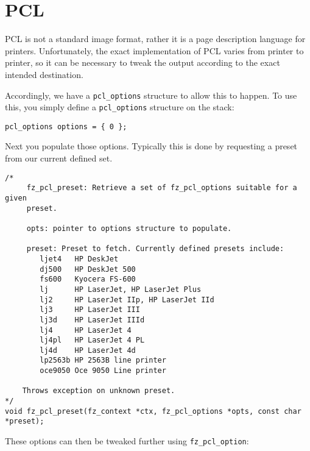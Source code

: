\documentclass[oneside]{book}
\begin{document}
\section{PCL}

PCL is not a standard image format, rather it is a page description language for printers. Unfortunately, the exact implementation of PCL varies from printer to printer, so it can be necessary to tweak the output according to the exact intended destination.

Accordingly, we have a \texttt{pcl\_options} structure to allow this to happen. To use this, you simply define a \texttt{pcl\_options} structure on the stack:

\begin{lstlisting}
pcl_options options = { 0 };
\end{lstlisting}

Next you populate those options. Typically this is done by requesting a preset from our current defined set.

\begin{lstlisting}
/*
	 fz_pcl_preset: Retrieve a set of fz_pcl_options suitable for a given
	 preset.

	 opts: pointer to options structure to populate.

	 preset: Preset to fetch. Currently defined presets include:
		ljet4	HP DeskJet
		dj500	HP DeskJet 500
		fs600	Kyocera FS-600
		lj		HP LaserJet, HP LaserJet Plus
		lj2		HP LaserJet IIp, HP LaserJet IId
		lj3		HP LaserJet III
		lj3d	HP LaserJet IIId
		lj4		HP LaserJet 4
		lj4pl	HP LaserJet 4 PL
		lj4d	HP LaserJet 4d
		lp2563b	HP 2563B line printer
		oce9050	Oce 9050 Line printer

	Throws exception on unknown preset.
*/
void fz_pcl_preset(fz_context *ctx, fz_pcl_options *opts, const char *preset);
\end{lstlisting}

These options can then be tweaked further using \texttt{fz\_pcl\_option}:
\end{document}
